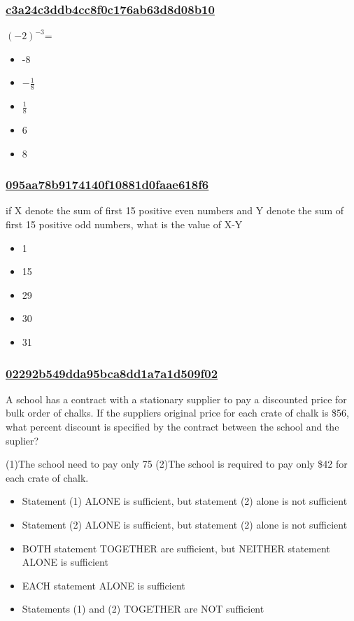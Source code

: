 \documentclass[]{beamer}
\begin{document}
\begin{frame}
    \frametitle{\underline{c3a24c3ddb4cc8f0c176ab63d8d08b10}}
    $(-2)^{-3}$=
    \begin{itemize}
        \item
            -8
        \item
            $-\frac{1}{8}$
        \item
            $\frac{1}{8}$
        \item
            6
        \item
            8
    \end{itemize}
\end{frame}
\begin{frame}
    \frametitle{\underline{095aa78b9174140f10881d0faae618f6}}
    if X denote the sum of first 15 positive even numbers and Y denote the sum of first 15 positive odd numbers, what is the value of X-Y

    \begin{itemize}
        \item
            1
        \item
            15
        \item
            29
        \item
            30
        \item
            31
    \end{itemize}
\end{frame}
\begin{frame}
    \frametitle{\underline{02292b549dda95bca8dd1a7a1d509f02}}
    A school has a contract with a stationary supplier to pay a discounted price for bulk order of chalks. If the suppliers original price for each crate of chalk is \$56, what percent discount is specified by the contract between the school and the suplier?\par
(1)The school need to pay only 75%
(2)The school is required to pay only \$42 for each crate of chalk.
    \begin{itemize}
        \item
            Statement (1) ALONE is sufficient, but statement (2) alone is not sufficient
        \item
            Statement (2) ALONE is sufficient, but statement (2) alone is not sufficient
        \item
            BOTH statement TOGETHER are sufficient, but NEITHER statement ALONE is sufficient
        \item
            EACH statement ALONE is sufficient
        \item
            Statements (1) and (2) TOGETHER are NOT sufficient
    \end{itemize}
\end{frame}
\end{document}
